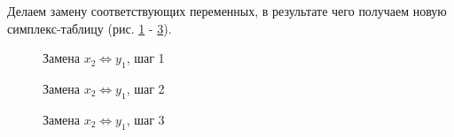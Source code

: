 \documentclass[a4paper,12pt]{report}
\begin{document}
\newpage

Делаем замену соответствующих переменных, в результате чего получаем новую симплекс-таблицу (рис. \ref{fig:lp_find_optsol_3} - \ref{fig:lp_find_optsol_5}).

\begin{figure}[ht]
\caption{Замена $x_{2} \Leftrightarrow y_{1}$, шаг 1}
\label{fig:lp_find_optsol_3}
\end{figure}

\newpage

\begin{figure}[ht]
\caption{Замена $x_{2} \Leftrightarrow y_{1}$, шаг 2}
\label{fig:lp_find_optsol_4}
\end{figure}

\begin{figure}[ht]
\caption{Замена $x_{2} \Leftrightarrow y_{1}$, шаг 3}
\label{fig:lp_find_optsol_5}
\end{figure}
\end{document}

